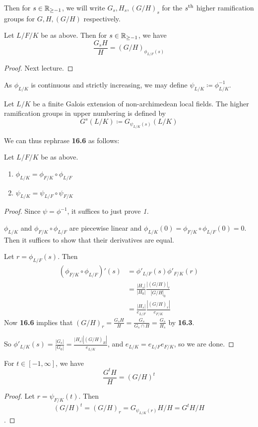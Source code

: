 \documentclass[10pt,a4paper]{article}
\begin{document}
Then for $s \in \mathbb{R}_{\geq-1}$, we will write $G_s, H_s, (G/H)_s$ for the $s\textsuperscript{th}$ higher ramification groups for $G, H, (G/H)$ respectively.
\begin{theorem}
  Let $L/F/K$ be as above. Then for $s\in \mathbb{R}_{\geq -1}$, we have
  \[\frac{G_sH}{H} = (G/H)_{\phi_{L/F}(s)}\]
\end{theorem}
\begin{proof}
  Next lecture.
\end{proof}
As $\phi_{L/K}$ is continuous and strictly increasing, we may define $\psi_{L/K} \coloneqq \phi_{L/K}^{-1}$.
\begin{definition}
  Let $L/K$ be a finite Galois extension of non-archimedean local fields. The higher ramification groups in upper numbering is defined by
  \[G^s(L/K) \coloneqq G_{\psi_{L/K}(s)}(L/K)\]
\end{definition}
We can thus rephrase \textbf{16.6} as follows:
\begin{lemma}Let $L/F/K$ be as above.
  \begin{enumerate}
    \item $\phi_{L/K}  = \phi_{F/K}\circ \phi_{L/F}$
    \item $\psi_{L/K} = \psi_{L/F} \circ \psi_{F/K}$
  \end{enumerate}
\end{lemma}
\begin{proof}
  Since $\psi = \phi^{-1}$, it suffices to just prove \textit{1.}

  $\phi_{L/K}$ and $\phi_{F/K}\circ \phi_{L/F}$ are piecewise linear and $\phi_{L/K}(0) = \phi_{F/K}\circ \phi_{L/F}(0) = 0$. Then it suffices to show that their derivatives are equal.

  Let $r = \phi_{L/F}(s)$. Then
  \begin{align*}
    (\phi_{F/K}\circ \phi_{L/F})'(s) &= \phi'_{L/F}(s) \phi'_{F/K}(r)\\
    &= \frac{|H_s|}{|H_0|}\frac{|(G/H)|_r}{|G/H|_0}\\
    &= \frac{|H_s|}{e_{L/F}}\frac{|(G/H)_r|}{e_{F/K}}
  \end{align*}
  Now \textbf{16.6} implies that $(G/H)_r = \frac{G_sH}{H} = \frac{G_s}{G_s \cap H} = \frac{G_s}{H_s}$ by \textbf{16.3}.

  So $\phi'_{L/K}(s) = \frac{|G_s|}{|G_0|} = \frac{|H_s||(G/H)_R|}{e_{L/K}}$, and $e_{L/K} = e_{L/F}e_{F/K}$, so we are done.
\end{proof}
\begin{corollary}For $t \in [-1, \infty]$, we have
  \[\frac{G^tH}{H} = (G/H)^t\]
\end{corollary}
\begin{proof}
  Let $r =\psi_{F/K}(t)$. Then
  \[(G/H)^t = (G/H)_r = G_{\psi_{L/K}(r)}H/H = G^tH/H\].
\end{proof}
\end{document}
